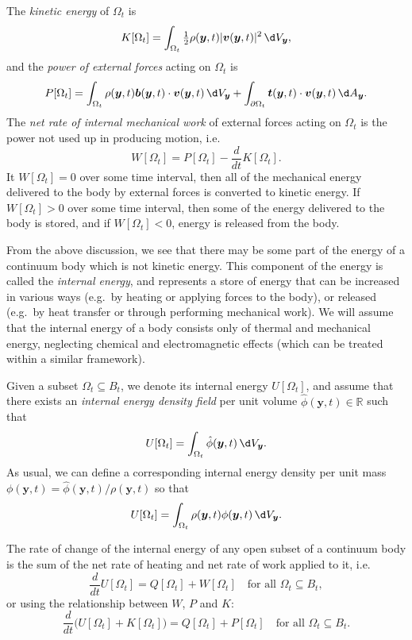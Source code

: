 \documentclass[
  letterpaper,
  DIV=11,
  numbers=noendperiod]{scrreprt}
\theoremstyle{plain}
\theoremstyle{remark}
\begin{document}
The \emph{kinetic energy} of \(\Omega_t\) is
\[K[\Omega_t] = \int_{\Omega_t}\tfrac12\rho({\boldsymbol{y}},t)|{\boldsymbol{v}}({\boldsymbol{y}},t)|^2{\,\d V_{{\boldsymbol{y}}}},\]
and the \emph{power of external forces} acting on \(\Omega_t\) is
\[P[\Omega_t] = \int_{\Omega_t}\rho({\boldsymbol{y}},t){\boldsymbol{b}}({\boldsymbol{y}},t)\cdot{\boldsymbol{v}}({\boldsymbol{y}},t){\,\d V_{{\boldsymbol{y}}}}+\int_{\partial \Omega_t}{\boldsymbol{t}}({\boldsymbol{y}},t)\cdot{\boldsymbol{v}}({\boldsymbol{y}},t){\,\d A_{{\boldsymbol{y}}}}.\]
The \emph{net rate of internal mechanical work} of external forces
acting on \(\Omega_t\) is the power not used up in producing motion,
i.e. \[W[\Omega_t] = P[\Omega_t]-\frac{d}{dt}K[\Omega_t].\] It
\(W[\Omega_t]=0\) over some time interval, then all of the mechanical
energy delivered to the body by external forces is converted to kinetic
energy. If \(W[\Omega_t]>0\) over some time interval, then some of the
energy delivered to the body is stored, and if \(W[\Omega_t]<0\), energy
is released from the body.

From the above discussion, we see that there may be some part of the
energy of a continuum body which is not kinetic energy. This component
of the energy is called the \emph{internal energy}, and represents a
store of energy that can be increased in various ways (e.g.~by heating
or applying forces to the body), or released (e.g.~by heat transfer or
through performing mechanical work). We will assume that the internal
energy of a body consists only of thermal and mechanical energy,
neglecting chemical and electromagnetic effects (which can be treated
within a similar framework).

Given a subset \(\Omega_t\subseteq B_t\), we denote its internal energy
\(U[\Omega_t]\), and assume that there exists an \emph{internal energy
density field} per unit volume
\(\hat{\phi}({\boldsymbol{y}},t)\in{\mathbb{R}}\) such that
\[U[\Omega_t] = \int_{\Omega_t}\hat{\phi}({\boldsymbol{y}},t){\,\d V_{{\boldsymbol{y}}}}.\]
As usual, we can define a corresponding internal energy density per unit
mass
\(\phi({\boldsymbol{y}},t) = \hat{\phi}({\boldsymbol{y}},t)/\rho({\boldsymbol{y}},t)\)
so that
\[U[\Omega_t] = \int_{\Omega_t} \rho({\boldsymbol{y}},t)\phi({\boldsymbol{y}},t){\,\d V_{{\boldsymbol{y}}}}.\]

\label{ax:1stLaw}{} The rate of change of the internal
energy of any open subset of a continuum body is the sum of the net rate
of heating and net rate of work applied to it, i.e.
\[\frac{d}{dt}U[\Omega_t]=Q[\Omega_t]+W[\Omega_t]\quad\text{for all }\Omega_t\subseteq B_t,\]
or using the relationship between \(W\), \(P\) and \(K\):
\[\frac{d}{dt}\Big(U[\Omega_t]+K[\Omega_t]\Big)=Q[\Omega_t]+P[\Omega_t]\quad\text{for all }\Omega_t\subseteq B_t.\]
\end{document}
